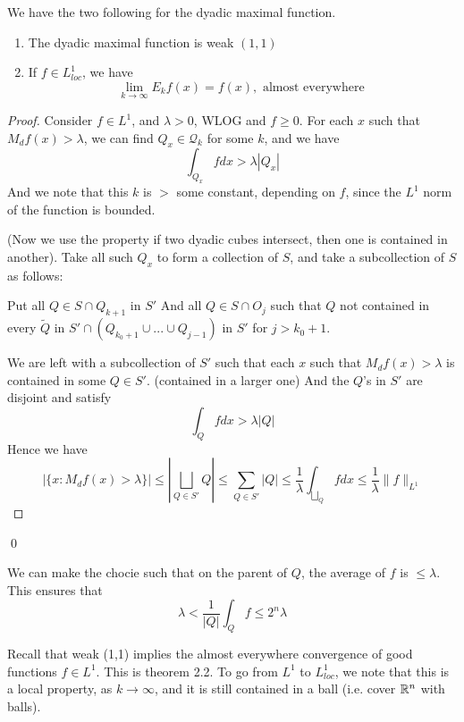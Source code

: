 \begin{theorem}
    We have the two following for the dyadic maximal function.
    \begin{enumerate}
        \item The dyadic maximal function is weak $(1,1)$
        \item If $f\in L_{loc}^1$, we have
            \begin{equation*}
                \lim_{k\to\infty}E_kf(x)=f(x), \text{ almost everywhere }
            \end{equation*}
    \end{enumerate}
\end{theorem}
\begin{proof}
    Consider $f\in L^1$, and $\lambda>0$, WLOG and $f\geq 0$. For each $x$ such that $M_df(x)>\lambda$, we can find $Q_x\in \mathcal{Q}_k$ for some $k$, and we have
    \begin{equation*}
        \int_{Q_x}fdx>\lambda|Q_x|
    \end{equation*}
    And we note that this $k$ is $>$ some constant, depending on $f$, since the $L^1$ norm of the function is bounded.

    (Now we use the property if two dyadic cubes intersect, then one is contained in another). Take all such $Q_x$ to form a collection of $S$, and take a subcollection of $S$ as follows:

    Put all $Q\in S\cap Q_{k+1}$ in $S'$ And all $Q\in S\cap O_j$ such that $Q$ not contained in every $\tilde{Q}$ in $S'\cap(Q_{k_0+1}\cup...\cup Q_{j-1})$ in $S'$ for $j>k_0+1$.

    We are left with a subcollection of $S'$ such that each $x$ such that $M_df(x)>\lambda$ is contained in some $Q\in S'$. (contained in a larger one) And the $Q$'s in $S'$ are disjoint and satisfy 
    \begin{equation*}
        \int_Qfdx>\lambda|Q|
    \end{equation*}
    Hence we have
    \begin{equation*}
        |\{x: M_df(x)>\lambda\}|\leq|\bigsqcup_{Q\in S'}Q |\leq\sum_{Q\in S'}|Q|\leq \frac{1}{\lambda}\int_{\bigsqcup_Q}fdx\leq\frac{1}{\lambda}\|f\|_{L^1}
    \end{equation*}
\end{proof}
\qed

\begin{remark}
    We can make the chocie such that on the parent of $Q$, the average of $f$ is $\leq\lambda$. This ensures that 
    \begin{equation*}
        \lambda<\frac{1}{|Q|}\int_Qf\leq 2^n\lambda
    \end{equation*}

    Recall that weak (1,1) implies the almost everywhere convergence of good functions $f\in L^1$. This is theorem 2.2. To go from $L^1$ to $L_{loc}^1$, we note that this is a local property, as $k\to\infty$, and it is still contained in a ball (i.e. cover $\mathbb{R}^n$ with balls).
\end{remark}

